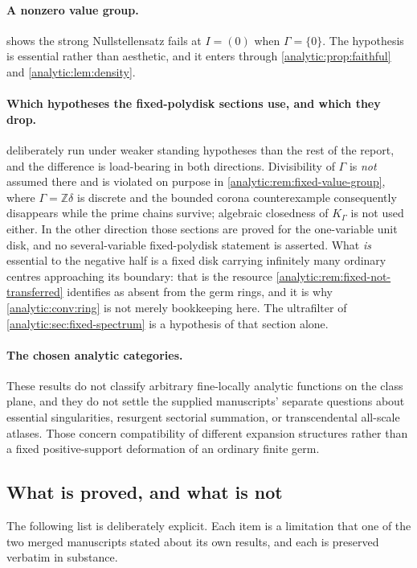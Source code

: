 \documentclass[11pt,letterpaper]{article}
\theoremstyle{definition}
\theoremstyle{remark}
\newcommand{\Z}{\mathbb Z}
\numberwithin{equation}{section}
\begin{document}
\paragraph{A nonzero value group.}
 shows the strong Nullstellensatz fails at
$I=(0)$ when $\Gamma=\{0\}$. The hypothesis is essential rather than
aesthetic, and it enters through
\cref{analytic:prop:faithful} and \cref{analytic:lem:density}.

\paragraph{Which hypotheses the fixed-polydisk sections use, and which they
drop.} 
deliberately run under weaker standing hypotheses than the rest of the
report, and the difference is load-bearing in both directions.
Divisibility of $\Gamma$ is \emph{not} assumed there and is violated on
purpose in \cref{analytic:rem:fixed-value-group}, where $\Gamma=\Z\delta$
is discrete and the bounded corona counterexample consequently disappears
while the prime chains survive; algebraic closedness of $K_\Gamma$ is not
used either. In the other direction those sections are proved for the
one-variable unit disk, and no several-variable fixed-polydisk statement is
asserted. What \emph{is} essential to the negative half is a fixed disk
carrying infinitely many ordinary centres approaching its boundary: that is
the resource \cref{analytic:rem:fixed-not-transferred} identifies as absent
from the germ rings, and it is why \cref{analytic:conv:ring} is not merely
bookkeeping here. The ultrafilter of
\cref{analytic:sec:fixed-spectrum} is a hypothesis of that section alone.

\paragraph{The chosen analytic categories.}
These results do not classify arbitrary fine-locally analytic functions on
the class plane, and they do not settle the supplied manuscripts' separate
questions about essential singularities, resurgent sectorial summation, or
transcendental all-scale atlases. Those concern compatibility of different
expansion structures rather than a fixed positive-support deformation of an
ordinary finite germ.

\subsection{What is proved, and what is not}
\label{analytic:subsec:not-proved}
The following list is deliberately explicit. Each item is a limitation that
one of the two merged manuscripts stated about its own results, and each is
preserved verbatim in substance.
\end{document}
